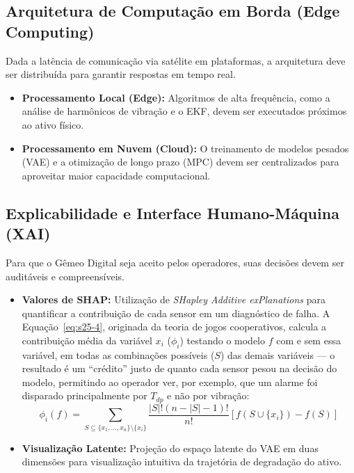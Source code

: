 \documentclass[12pt,a4paper]{article}
\numberwithin{equation}{section}
\numberwithin{table}{section}
\numberwithin{figure}{section}
\begin{document}
{	\subsection{Arquitetura de Computação em Borda (Edge Computing)}
	Dada a latência de comunicação via satélite em plataformas, a arquitetura deve ser distribuída para garantir respostas em tempo real.
	\begin{itemize}
		\item \textbf{Processamento Local (Edge):} Algoritmos de alta frequência, como a análise de harmônicos de vibração e o EKF, devem ser executados próximos ao ativo físico.
		\item \textbf{Processamento em Nuvem (Cloud):} O treinamento de modelos pesados (VAE) e a otimização de longo prazo (MPC) devem ser centralizados para aproveitar maior capacidade computacional.
	\end{itemize}
	
	\subsection{Explicabilidade e Interface Humano-Máquina (XAI)}
	Para que o Gêmeo Digital seja aceito pelos operadores, suas decisões devem ser auditáveis e compreensíveis.
	\begin{itemize}
		\item \textbf{Valores de SHAP:} Utilização de \textit{SHapley Additive exPlanations} para quantificar a contribuição de cada sensor em um diagnóstico de falha. A Equação~\eqref{eq:s25-4}, originada da teoria de jogos cooperativos, calcula a contribuição média da variável $x_i$ ($\phi_i$) testando o modelo $f$ com e sem essa variável, em todas as combinações possíveis ($S$) das demais variáveis — o resultado é um ``crédito'' justo de quanto cada sensor pesou na decisão do modelo, permitindo ao operador ver, por exemplo, que um alarme foi disparado principalmente por $T_{dp}$ e não por vibração:
		\begin{equation}\label{eq:s25-4}
 \phi_i(f) = \sum_{S \subseteq \{x_1, \dots, x_n\} \setminus \{x_i\}} \frac{|S|! (n - |S| - 1)!}{n!} [f(S \cup \{x_i\}) - f(S)]
\end{equation}
		\item \textbf{Visualização Latente:} Projeção do espaço latente do VAE em duas dimensões para visualização intuitiva da trajetória de degradação do ativo.
	\end{itemize}
	
}
\end{document}
